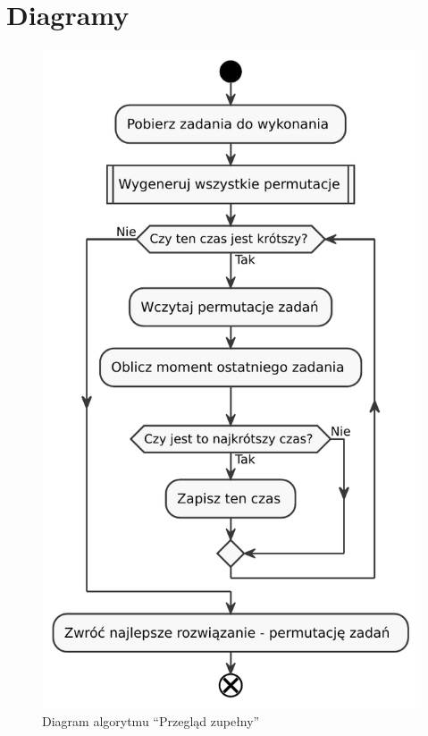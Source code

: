 \section{Diagramy}
\begin{figure}[H]
	\centering
	\includegraphics[scale=0.65]{chapters/chapter4/brute_force.pdf}
	\caption{Diagram algorytmu ``Przegląd zupełny''}
	\label{brute_force}
\end{figure}

